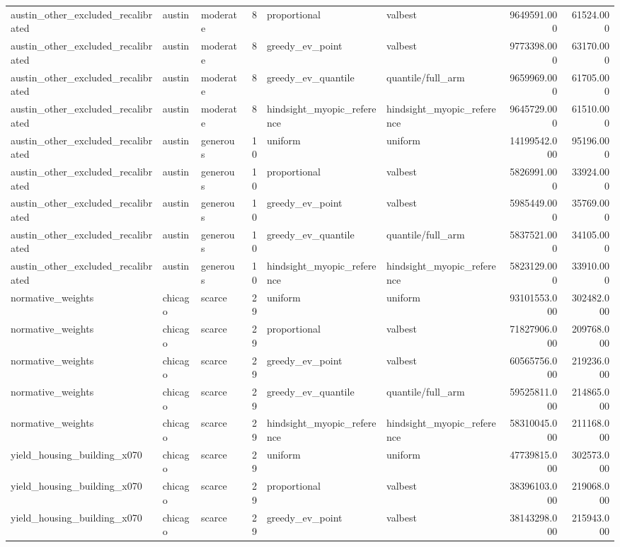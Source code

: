 \begin{tabular}{lllrllrr}
austin\_other\_excluded\_recalibrated & austin & moderate & 8 & proportional & valbest & 9649591.000 & 61524.000 \\
austin\_other\_excluded\_recalibrated & austin & moderate & 8 & greedy\_ev\_point & valbest & 9773398.000 & 63170.000 \\
austin\_other\_excluded\_recalibrated & austin & moderate & 8 & greedy\_ev\_quantile & quantile/full\_arm & 9659969.000 & 61705.000 \\
austin\_other\_excluded\_recalibrated & austin & moderate & 8 & hindsight\_myopic\_reference & hindsight\_myopic\_reference & 9645729.000 & 61510.000 \\
austin\_other\_excluded\_recalibrated & austin & generous & 10 & uniform & uniform & 14199542.000 & 95196.000 \\
austin\_other\_excluded\_recalibrated & austin & generous & 10 & proportional & valbest & 5826991.000 & 33924.000 \\
austin\_other\_excluded\_recalibrated & austin & generous & 10 & greedy\_ev\_point & valbest & 5985449.000 & 35769.000 \\
austin\_other\_excluded\_recalibrated & austin & generous & 10 & greedy\_ev\_quantile & quantile/full\_arm & 5837521.000 & 34105.000 \\
austin\_other\_excluded\_recalibrated & austin & generous & 10 & hindsight\_myopic\_reference & hindsight\_myopic\_reference & 5823129.000 & 33910.000 \\
normative\_weights & chicago & scarce & 29 & uniform & uniform & 93101553.000 & 302482.000 \\
normative\_weights & chicago & scarce & 29 & proportional & valbest & 71827906.000 & 209768.000 \\
normative\_weights & chicago & scarce & 29 & greedy\_ev\_point & valbest & 60565756.000 & 219236.000 \\
normative\_weights & chicago & scarce & 29 & greedy\_ev\_quantile & quantile/full\_arm & 59525811.000 & 214865.000 \\
normative\_weights & chicago & scarce & 29 & hindsight\_myopic\_reference & hindsight\_myopic\_reference & 58310045.000 & 211168.000 \\
yield\_housing\_building\_x070 & chicago & scarce & 29 & uniform & uniform & 47739815.000 & 302573.000 \\
yield\_housing\_building\_x070 & chicago & scarce & 29 & proportional & valbest & 38396103.000 & 219068.000 \\
yield\_housing\_building\_x070 & chicago & scarce & 29 & greedy\_ev\_point & valbest & 38143298.000 & 215943.000 \\

\end{tabular}
